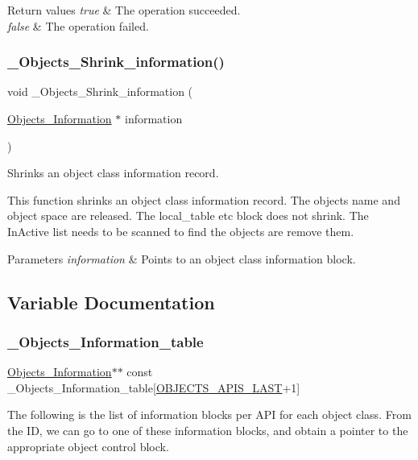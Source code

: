 \begin{DoxyRetVals}{Return values}
{\em true} & The operation succeeded. \\
\hline
{\em false} & The operation failed. \\
\hline
\end{DoxyRetVals}
\mbox{\label{group__RTEMSScoreObject_ga1d3e97a3ed2e9d19c544269a7444be21}} 
\subsubsection{\texorpdfstring{\_Objects\_Shrink\_information()}{\_Objects\_Shrink\_information()}}
{\footnotesize\ttfamily void \+\_\+\+Objects\+\_\+\+Shrink\+\_\+information (\begin{DoxyParamCaption}\item[{\mbox{\hyperlink{structObjects__Information}{Objects\+\_\+\+Information}} $\ast$}]{information }\end{DoxyParamCaption})}



Shrinks an object class information record. 

This function shrinks an object class information record. The object\textquotesingle{}s name and object space are released. The local\+\_\+table etc block does not shrink. The In\+Active list needs to be scanned to find the objects are remove them.


\begin{DoxyParams}{Parameters}
{\em information} & Points to an object class information block. \\
\hline
\end{DoxyParams}


\subsection{Variable Documentation}
\mbox{\label{group__RTEMSScoreObject_ga3d8cc86c421588f6c0d789a3374ebf79}} 
\subsubsection{\texorpdfstring{\_Objects\_Information\_table}{\_Objects\_Information\_table}}
{\footnotesize\ttfamily \mbox{\hyperlink{structObjects__Information}{Objects\+\_\+\+Information}}$\ast$$\ast$ const \+\_\+\+Objects\+\_\+\+Information\+\_\+table\mbox{[}\mbox{\hyperlink{group__RTEMSScoreObject_ga238bef3e73c68907c9fbc51497250c13}{O\+B\+J\+E\+C\+T\+S\+\_\+\+A\+P\+I\+S\+\_\+\+L\+A\+ST}}+1\mbox{]}}

The following is the list of information blocks per A\+PI for each object class. From the ID, we can go to one of these information blocks, and obtain a pointer to the appropriate object control block. 